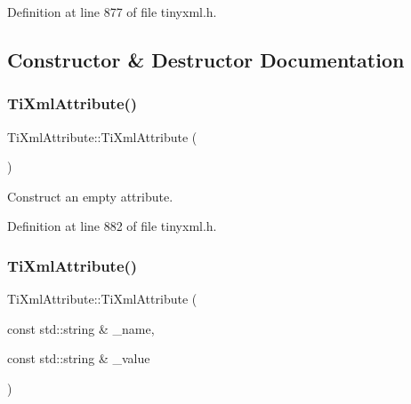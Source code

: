 Definition at line 877 of file tinyxml.\+h.



\subsection{Constructor \& Destructor Documentation}
\hypertarget{class_ti_xml_attribute_a9cfa3c8179873fd485d83003b114f8e1}{}\label{class_ti_xml_attribute_a9cfa3c8179873fd485d83003b114f8e1} 
\subsubsection{\texorpdfstring{Ti\+Xml\+Attribute()}{TiXmlAttribute()}\hspace{0.1cm}{\footnotesize\ttfamily [1/4]}}
{\footnotesize\ttfamily Ti\+Xml\+Attribute\+::\+Ti\+Xml\+Attribute (\begin{DoxyParamCaption}{ }\end{DoxyParamCaption})\hspace{0.3cm}{\ttfamily [inline]}}



Construct an empty attribute. 



Definition at line 882 of file tinyxml.\+h.

\hypertarget{class_ti_xml_attribute_a052213522caac3979960e0714063861d}{}\label{class_ti_xml_attribute_a052213522caac3979960e0714063861d} 
\subsubsection{\texorpdfstring{Ti\+Xml\+Attribute()}{TiXmlAttribute()}\hspace{0.1cm}{\footnotesize\ttfamily [2/4]}}
{\footnotesize\ttfamily Ti\+Xml\+Attribute\+::\+Ti\+Xml\+Attribute (\begin{DoxyParamCaption}\item[{const std\+::string \&}]{\+\_\+name,  }\item[{const std\+::string \&}]{\+\_\+value }\end{DoxyParamCaption})\hspace{0.3cm}{\ttfamily [inline]}}



